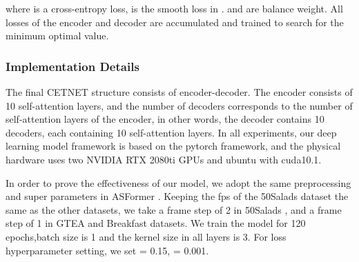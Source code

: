 \documentclass[runningheads]{llncs}
\begin{document}
\noindent where  is a cross-entropy loss,  is the smooth loss in \cite{farha2019ms}.  and  are balance weight. All losses of the encoder and decoder are accumulated and trained to search for the minimum optimal value.
\subsubsection{Implementation Details}
\par{
	The final CETNET structure consists of encoder-decoder. The encoder consists of 10 self-attention layers, and the number of decoders corresponds to the number of self-attention layers of the encoder, in other words, the decoder contains 10 decoders, each containing 10 self-attention layers. In all experiments, our deep learning model framework is based on the pytorch framework, and the physical hardware uses two NVIDIA RTX 2080ti GPUs and ubuntu with cuda10.1.	
}
\par{
	In order to prove the effectiveness of our model, we adopt the same preprocessing and super parameters in ASFormer \cite{yi2021asformer}. Keeping the fps of the 50Salads dataset the same as the other datasets, we take a frame step of 2 in 50Salads , and a frame step of 1 in GTEA and Breakfast datasets. We train the model for 120 epochs,batch size is 1 and the kernel size in all layers is 3. For loss hyperparameter setting, we set  = 0.15,  = 0.001.
}
\end{document}
